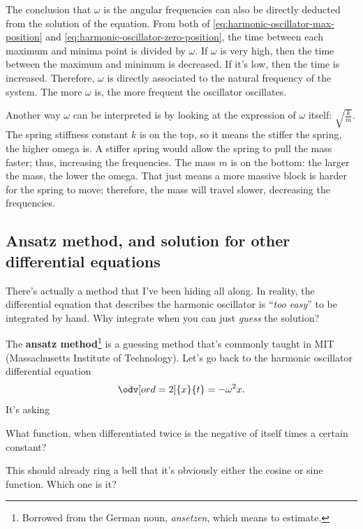 The conclusion that $\omega$ is the angular frequencies can also be directly deducted from the solution of the equation. From both of \cref{eq:harmonic-oscillator-max-position} and \cref{eq:harmonic-oscillator-zero-position}, the time between each maximum and minima point is divided by $\omega$. If $\omega$ is very high, then the time between the maximum and minimum is decreased. If it's low, then the time is increased. Therefore, $\omega$ is directly associated to the natural frequency of the system. The more $\omega$ is, the more frequent the oscillator oscillates.

Another way $\omega$ can be interpreted is by looking at the expression of $\omega$ itself: $\sqrt{\frac{k}{m}}$. The spring stiffness constant $k$ is on the top, so it means the stiffer the spring, the higher omega is. A stiffer spring would allow the spring to pull the mass faster; thus, increasing the frequencies. The mass $m$ is on the bottom: the larger the mass, the lower the omega. That just means a more massive block is harder for the spring to move; therefore, the mass will travel slower, decreasing the frequencies.

\subsection{Ansatz method, and solution for other differential equations}

There's actually a method that I've been hiding all along. In reality, the differential equation that describes the harmonic oscillator is \enquote{\emph{too easy}} to be integrated by hand. Why integrate when you can just \emph{guess} the solution?

The \textbf{ansatz method}\footnote{Borrowed from the German noun, \emph{ansetzen}, which means to estimate.} is a guessing method that's commonly taught in MIT (Massachusetts Institute of Technology). Let's go back to the harmonic oscillator differential equation
\begin{equation}
	\odv[ord = 2]{x}{t} = -\omega^2 x.
\end{equation}
It's asking
\begin{displayquote}
	What function, when differentiated twice is the negative of itself times a certain constant?
\end{displayquote}
This should already ring a bell that it's obviously either the cosine or sine function. Which one is it?

